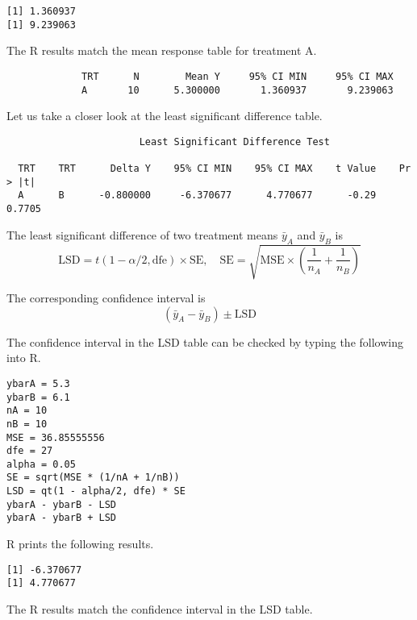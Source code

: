 \documentclass[12pt]{article}
\begin{document}
{\scriptsize\begin{verbatim}
[1] 1.360937
[1] 9.239063
\end{verbatim}}

The R results match the mean response table for treatment A.

{\scriptsize\begin{verbatim}
             TRT      N        Mean Y     95% CI MIN     95% CI MAX
             A       10      5.300000       1.360937       9.239063
\end{verbatim}}

\newpage

Let us take a closer look at the least significant difference table.

{\scriptsize\begin{verbatim}
                       Least Significant Difference Test

  TRT    TRT      Delta Y    95% CI MIN    95% CI MAX    t Value    Pr > |t|  
  A      B      -0.800000     -6.370677      4.770677      -0.29      0.7705  
\end{verbatim}}

The least significant difference of two treatment means $\bar y_A$ and $\bar y_B$ is
\begin{equation*}
\text{LSD}=t(1-\alpha/2,\text{dfe})\times\text{SE},
\quad
\text{SE}=\sqrt{\text{MSE}\times\left(\frac{1}{n_A}+\frac{1}{n_B}\right)}
\end{equation*}

The corresponding confidence interval is
\begin{equation*}
(\bar y_A-\bar y_B)\pm\text{LSD}
\end{equation*}

The confidence interval in the LSD table can be checked by typing the following into R.

{\scriptsize\begin{verbatim}
ybarA = 5.3
ybarB = 6.1
nA = 10
nB = 10
MSE = 36.85555556
dfe = 27
alpha = 0.05
SE = sqrt(MSE * (1/nA + 1/nB))
LSD = qt(1 - alpha/2, dfe) * SE
ybarA - ybarB - LSD
ybarA - ybarB + LSD
\end{verbatim}}

R prints the following results.

{\scriptsize\begin{verbatim}
[1] -6.370677
[1] 4.770677
\end{verbatim}}

The R results match the confidence interval in the LSD table.
\end{document}
